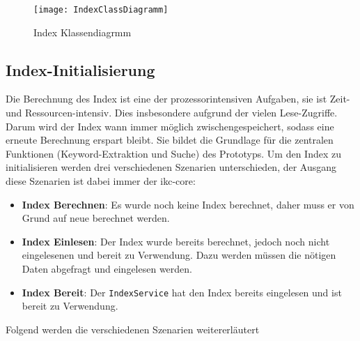     \begin{figure}[H]
    \centering
    \texttt{[image: IndexClassDiagramm]}
    \caption{Index Klassendiagrmm}
    \label{fig:indexclassdiagramm}
    \end{figure}
    
    
\subsection{Index-Initialisierung}


Die Berechnung des Index ist eine der prozessorintensiven Aufgaben, sie ist Zeit- und Ressourcen-intensiv. Dies insbesondere aufgrund der vielen Lese-Zugriffe. Darum wird der Index wann immer möglich zwischengespeichert, sodass eine erneute Berechnung erspart bleibt. Sie bildet die Grundlage für die zentralen Funktionen (\gls{Keyword}-Ex\-trak\-tion und Suche) des Prototyps. Um den Index zu initialisieren werden drei verschiedenen Szenarien unterschieden, der Ausgang diese Szenarien ist dabei immer der \gls{ikc-core}:
\begin{itemize}
    \item \textbf{Index Berechnen}: Es wurde noch keine Index berechnet, daher muss er von Grund auf neue berechnet werden.
    \item \textbf{Index Einlesen}: Der Index wurde bereits berechnet, jedoch noch nicht eingelesenen und bereit zu Verwendung. Dazu werden müssen die nötigen Daten abgefragt und eingelesen werden.
    \item \textbf{Index Bereit}: Der \texttt{IndexService} hat den Index bereits eingelesen und ist bereit zu Verwendung.
\end{itemize}
Folgend werden die verschiedenen Szenarien weitererläutert

